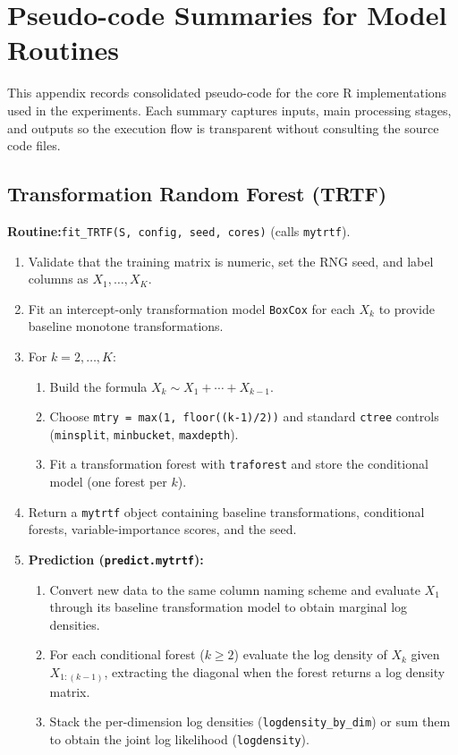 \documentclass[11pt,a4paper,twoside]{book}\usepackage[]{graphicx}\usepackage[]{xcolor}
\begin{document}
\section{Pseudo-code Summaries for Model Routines}

This appendix records consolidated pseudo-code for the core R implementations used in the experiments. Each summary captures inputs, main processing stages, and outputs so the execution flow is transparent without consulting the source code files.

\subsection{Transformation Random Forest (TRTF)}\label{app:trtf}

\textbf{Routine:}\quad\texttt{fit\_TRTF(S, config, seed, cores)} (calls \texttt{mytrtf}).

\begin{enumerate}
  \item Validate that the training matrix is numeric, set the RNG seed, and label columns as $X_1,\ldots,X_K$.
  \item Fit an intercept-only transformation model \texttt{BoxCox} for each $X_k$ to provide baseline monotone transformations.
  \item For $k = 2,\ldots,K$:
    \begin{enumerate}
      \item Build the formula $X_k \sim X_1 + \cdots + X_{k-1}$.
      \item Choose \texttt{mtry = max(1, floor((k-1)/2))} and standard \texttt{ctree} controls (\texttt{minsplit}, \texttt{minbucket}, \texttt{maxdepth}).
      \item Fit a transformation forest with \texttt{traforest} and store the conditional model (one forest per $k$).
    \end{enumerate}
  \item Return a \texttt{mytrtf} object containing baseline transformations, conditional forests, variable-importance scores, and the seed.

  \item \textbf{Prediction (\texttt{predict.mytrtf}):}
    \begin{enumerate}
      \item Convert new data to the same column naming scheme and evaluate $X_1$ through its baseline transformation model to obtain marginal log densities.
      \item For each conditional forest ($k\geq 2$) evaluate the log density of $X_k$ given $X_{1:(k-1)}$, extracting the diagonal when the forest returns a log density matrix.
      \item Stack the per-dimension log densities (\texttt{logdensity\_by\_dim}) or sum them to obtain the joint log likelihood (\texttt{logdensity}).
    \end{enumerate}
\end{enumerate}
\end{document}
